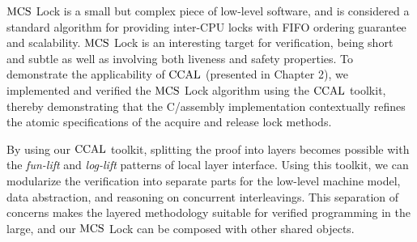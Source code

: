 $\mathrm{MCS}$ Lock is a small but complex piece of low-level software, 
and is considered a standard algorithm for providing inter-CPU locks with FIFO ordering guarantee and scalability. 
$\mathrm{MCS}$ Lock is an interesting target for verification, being short and subtle as well as involving both liveness and safety properties. 
To demonstrate the applicability of $\mathrm{CCAL}$ (presented in Chapter 2), we implemented and verified the $\mathrm{MCS}$ Lock algorithm using the $\mathrm{CCAL}$  toolkit, thereby demonstrating that the C/assembly implementation contextually refines the atomic specifications of the acquire and release lock methods.

By using our  $\mathrm{CCAL}$ toolkit, splitting the proof into layers becomes possible with the \textit{fun-lift} and \textit{log-lift} patterns of local layer interface. 
Using this toolkit, we can modularize the verification into separate parts for the low-level machine model, data abstraction, 
and reasoning on concurrent interleavings. 
This separation of concerns makes the layered methodology suitable for verified programming in the large, and our $\mathrm{MCS}$
Lock can be composed with other shared objects.
